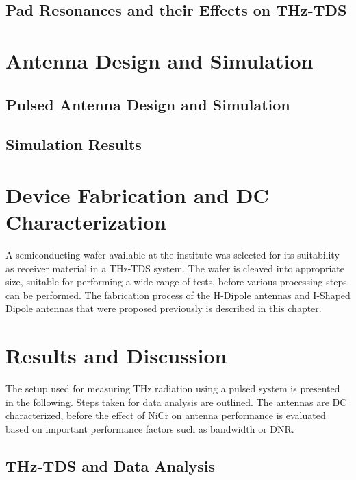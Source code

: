 \documentclass[
	german,%
	accentcolor=9c,%
	ruledheaders=section,%
	class=report,%
	thesis={type=bachelor},%
	fontsize=11pt,%
	parskip=half-,%
	custommargins=false,%
	marginpar=false,%
	BCOR = 0mm,%
 	logofile=tools/logo-installation/TUDa-logos/tuda_logo.png,%
]{tudapub}
\begin{document}
\section{Pad Resonances and their Effects on THz-TDS}
\label{sec:padResonances}


\chapter{Antenna Design and Simulation}

\section{Pulsed Antenna Design and Simulation}


\section{Simulation Results}

\label{sec:sim_results}



\chapter{Device Fabrication and DC Characterization}
A semiconducting wafer available at the institute was selected for its suitability as receiver material in a THz-TDS system. The wafer is cleaved into appropriate size, suitable for performing a wide range of tests, before various processing steps can be performed. The fabrication process of the H-Dipole antennas and I-Shaped Dipole antennas that were proposed previously is described in this chapter.



\chapter{Results and Discussion}

The setup used for measuring THz radiation using a pulsed system is presented in the following. Steps taken for data analysis are outlined. The antennas are DC characterized, before the effect of NiCr on antenna performance is evaluated based on important performance factors such as bandwidth or DNR. 

\section{THz-TDS and Data Analysis}
\label{setup}

\end{document}
